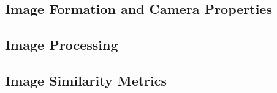 \subsection{Image Formation and Camera Properties}

\subsection{Image Processing}

\subsection{Image Similarity Metrics}
